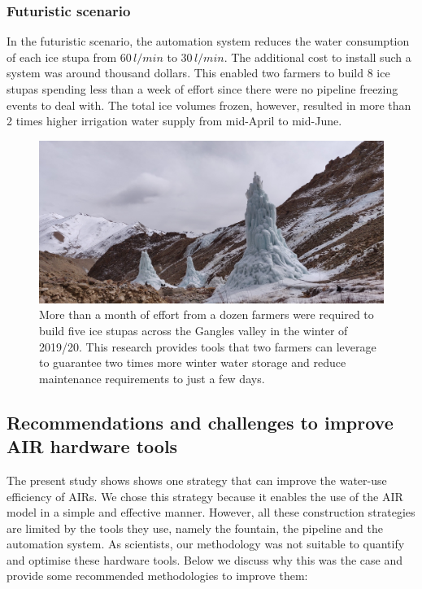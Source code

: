 \documentclass[tc, manuscript]{copernicus}
\begin{document}
\subsubsection{Futuristic scenario}

In the futuristic scenario, the automation system reduces the water consumption of each ice stupa from
$60\,l/min$ to $30\,l/min$. The additional cost to install such a system was around thousand dollars. This
enabled two farmers to build 8 ice stupas spending less than a week of effort since there were no pipeline
freezing events to deal with. The total ice volumes frozen, however, resulted in more than 2 times higher
irrigation water supply from mid-April to mid-June.

\begin{figure}[htb]
	\includegraphics[width=\textwidth]{Figures/icestupa_valley}

  \caption{More than a month of effort from a dozen farmers were required to build five ice stupas across the
  Gangles valley in the winter of 2019/20. This research provides tools that two farmers can leverage to
  guarantee two times more winter water storage and reduce maintenance requirements to just a few days.}

	\label{fig:icestupa_valley}
\end{figure}


\subsection{Recommendations and challenges to improve AIR hardware tools}

The present study shows shows one strategy that can improve the water-use efficiency of \ac{AIRs}. We chose this
strategy because it enables the use of the \ac{AIR} model in a simple and effective manner. However, all these
construction strategies are limited by the tools they use, namely the fountain, the pipeline and the automation
system. As scientists, our methodology was not suitable to quantify and optimise these hardware tools. Below we
discuss why this was the case and provide some recommended methodologies to improve them:
\end{document}
